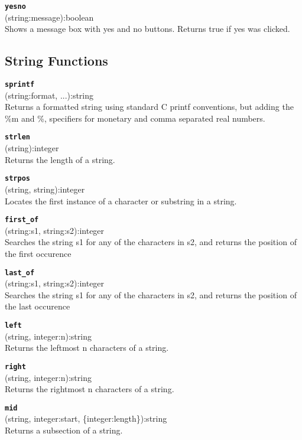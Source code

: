 \documentclass{article}
\begin{document}
{\large \texttt{\textbf{yesno}}}\\
\textsf{ (string:message):boolean }\\
Shows a message box with yes and no buttons.  Returns true if yes was clicked.

\subsection{String Functions}
{\large \texttt{\textbf{sprintf}}}\\
\textsf{ (string:format, ...):string }\\
Returns a formatted string using standard C printf conventions, but adding the \%m and \%, specifiers for monetary and comma separated real numbers.

{\large \texttt{\textbf{strlen}}}\\
\textsf{ (string):integer }\\
Returns the length of a string.

{\large \texttt{\textbf{strpos}}}\\
\textsf{ (string, string):integer }\\
Locates the first instance of a character or substring in a string.

{\large \texttt{\textbf{first\_of}}}\\
\textsf{ (string:s1, string:s2):integer }\\
Searches the string s1 for any of the characters in s2, and returns the position of the first occurence

{\large \texttt{\textbf{last\_of}}}\\
\textsf{ (string:s1, string:s2):integer }\\
Searches the string s1 for any of the characters in s2, and returns the position of the last occurence

{\large \texttt{\textbf{left}}}\\
\textsf{ (string, integer:n):string }\\
Returns the leftmost n characters of a string.

{\large \texttt{\textbf{right}}}\\
\textsf{ (string, integer:n):string }\\
Returns the rightmost n characters of a string.

{\large \texttt{\textbf{mid}}}\\
\textsf{ (string, integer:start, \{integer:length\}):string }\\
Returns a subsection of a string.
\end{document}
